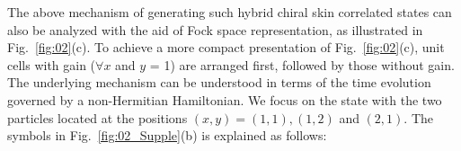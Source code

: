 \documentclass[longbibliography, aps, prx, amsmath, amssymb, amsfonts, twocolumn,superscriptaddress, footinbib]{revtex4-1}
\begin{document}
	The above mechanism of generating such hybrid chiral skin correlated states can also be analyzed with the aid of Fock space representation, as illustrated in Fig.~\ref{fig:02}(c). 
	To achieve a more compact presentation of Fig.~\ref{fig:02}(c), unit cells with gain ($\forall x$ and $y$ = 1) are arranged first, followed by those without gain.
	The underlying mechanism can be understood in terms of the time evolution governed by a non-Hermitian Hamiltonian. 
	We focus on the state with the two particles located at the positions $(x,y)=(1,1), (1,2)$ and $(2,1)$.
	The symbols in Fig.~\ref{fig:02_Supple}(b) is explained as follows:
\end{document}
